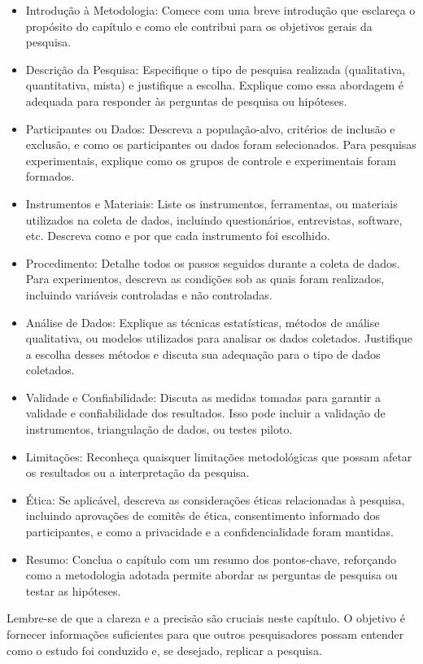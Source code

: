 	\begin{itemize}
		\item Introdução à Metodologia: Comece com uma breve introdução que esclareça o propósito do capítulo e como ele contribui para os objetivos gerais da pesquisa.
		\item Descrição da Pesquisa: Especifique o tipo de pesquisa realizada (qualitativa, quantitativa, mista) e justifique a escolha. Explique como essa abordagem é adequada para responder às perguntas de pesquisa ou hipóteses.
		\item Participantes ou Dados: Descreva a população-alvo, critérios de inclusão e exclusão, e como os participantes ou dados foram selecionados. Para pesquisas experimentais, explique como os grupos de controle e experimentais foram formados.
		\item Instrumentos e Materiais: Liste os instrumentos, ferramentas, ou materiais utilizados na coleta de dados, incluindo questionários, entrevistas, software, etc. Descreva como e por que cada instrumento foi escolhido.
		\item Procedimento: Detalhe todos os passos seguidos durante a coleta de dados. Para experimentos, descreva as condições sob as quais foram realizados, incluindo variáveis controladas e não controladas.
		\item Análise de Dados: Explique as técnicas estatísticas, métodos de análise qualitativa, ou modelos utilizados para analisar os dados coletados. Justifique a escolha desses métodos e discuta sua adequação para o tipo de dados coletados.
		\item Validade e Confiabilidade: Discuta as medidas tomadas para garantir a validade e confiabilidade dos resultados. Isso pode incluir a validação de instrumentos, triangulação de dados, ou testes piloto.
		\item Limitações: Reconheça quaisquer limitações metodológicas que possam afetar os resultados ou a interpretação da pesquisa.
		\item Ética: Se aplicável, descreva as considerações éticas relacionadas à pesquisa, incluindo aprovações de comitês de ética, consentimento informado dos participantes, e como a privacidade e a confidencialidade foram mantidas.
		\item Resumo: Conclua o capítulo com um resumo dos pontos-chave, reforçando como a metodologia adotada permite abordar as perguntas de pesquisa ou testar as hipóteses.
	\end{itemize}

	Lembre-se de que a clareza e a precisão são cruciais neste capítulo. O objetivo é fornecer informações suficientes para que outros pesquisadores possam entender como o estudo foi conduzido e, se desejado, replicar a pesquisa.